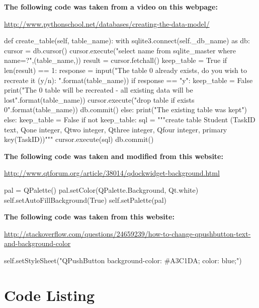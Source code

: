 \textbf{The following code was taken from a video on this webpage: }

\url{http://www.pythonschool.net/databases/creating-the-data-model/}

\begin{python}
def create_table(self, table_name):
        with sqlite3.connect(self._db_name) as db:
            cursor = db.cursor()
            cursor.execute("select name from sqlite_master where name=?",(table_name,))
            result = cursor.fetchall()
            keep_table = True
            if len(result) == 1:
                response = input("The table {0} already exists, do you wish to recreate it (y/n): ".format(table_name))
                if response == "y":
                    keep_table = False
                    print("The {0} table will be recreated - all existing data will be lost".format(table_name))
                    cursor.execute("drop table if exists {0}".format(table_name))
                    db.commit()
                else:
                    print("The existing table was kept")
            else:
                keep_table = False
            if not keep_table:
                sql = """create table Student
                (TaskID text,
                Qone integer,
                Qtwo integer,
                Qthree integer,
                Qfour integer,
                primary key(TaskID))"""
                cursor.execute(sql)
                db.commit()
\end{python}

\textbf{The following code was taken and modified from this website: }

\url{http://www.qtforum.org/article/38014/qdockwidget-background.html}

\begin{python}
pal = QPalette()
        pal.setColor(QPalette.Background, Qt.white)
        self.setAutoFillBackground(True)
        self.setPalette(pal)
\end{python}

\textbf{The following code was taken from this website: }

\url{http://stackoverflow.com/questions/24659239/how-to-change-qpushbutton-text-and-background-color}

\begin{python}
self.setStyleSheet("QPushButton {background-color: #A3C1DA; color: blue;}")
\end{python}

\section{Code Listing}


